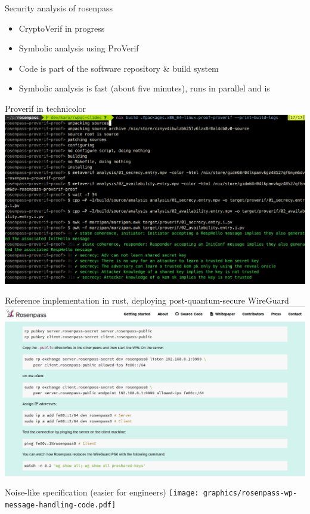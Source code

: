 \begin{frame}{Security analysis of rosenpass}
  \begin{itemize}
	\item CryptoVerif in progress
	\item Symbolic analysis using ProVerif
  \item Code is part of the software repository \& build system
  \item Symbolic analysis is fast (about five minutes), runs in parallel and is
  \end{itemize}
\end{frame}

\begin{frame}{Proverif in technicolor}
  \includegraphics[height=.80\textheight]{assets/2023-03-20-symbolic-analysis-screenshot.png}
\end{frame}

\begin{frame}{Reference implementation in rust, deploying post-quantum-secure WireGuard}
  \includegraphics[height=.80\textheight]{assets/2023-03-20-rg-tutorial-screenshot.png}
\end{frame}

\begin{frame}{Noise-like specification (easier for engineers)}
  \texttt{[image: graphics/rosenpass-wp-message-handling-code.pdf]}
\end{frame}
